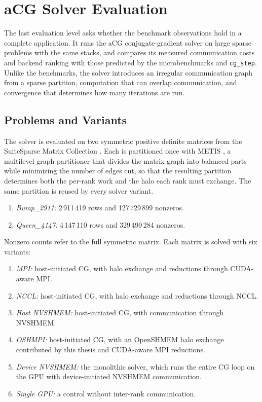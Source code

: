 \section{aCG Solver Evaluation}\label{sec:acg-method}

The last evaluation level asks whether the benchmark observations hold in a complete application. It runs the aCG conjugate-gradient solver \cite{trotter_cpu-_2025} on large sparse problems with the same stacks, and compares its measured communication costs and backend ranking with those predicted by the microbenchmarks and \texttt{cg\_step}. Unlike the benchmarks, the solver introduces an irregular communication graph from a sparse partition, computation that can overlap communication, and convergence that determines how many iterations are run.

\subsection{Problems and Variants}

The solver is evaluated on two symmetric positive definite matrices from the SuiteSparse Matrix Collection \cite{davis_suitesparse_2011}. Each is partitioned once with METIS \cite{karypis_metis_2026}, a multilevel graph partitioner that divides the matrix graph into balanced parts while minimizing the number of edges cut, so that the resulting partition determines both the per-rank work and the halo each rank must exchange. The same partition is reused by every solver variant.

\begin{enumerate}
    \item \emph{Bump\_2911:} 2\,911\,419 rows and 127\,729\,899 nonzeros.
    \item \emph{Queen\_4147:} 4\,147\,110 rows and 329\,499\,284 nonzeros.
\end{enumerate}

Nonzero counts refer to the full symmetric matrix. Each matrix is solved with six variants:

\begin{enumerate}
    \item \emph{MPI:} host-initiated CG, with halo exchange and reductions through CUDA-aware MPI.
    \item \emph{NCCL:} host-initiated CG, with halo exchange and reductions through NCCL.
    \item \emph{Host NVSHMEM:} host-initiated CG, with communication through NVSHMEM.
    \item \emph{OSHMPI:} host-initiated CG, with an OpenSHMEM halo exchange contributed by this thesis and CUDA-aware MPI reductions.
    \item \emph{Device NVSHMEM:} the monolithic solver, which runs the entire CG loop on the GPU with device-initiated NVSHMEM communication.
    \item \emph{Single GPU:} a control without inter-rank communication.
\end{enumerate}

